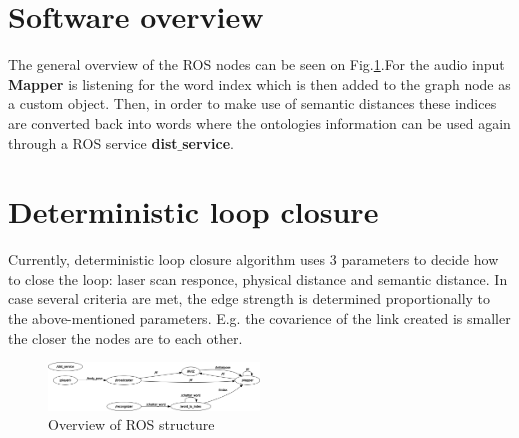\documentclass[conference]{IEEEtran}
\begin{document}
\section{Software overview}

The general overview of the ROS nodes can be seen on Fig.\ref{ROS}.For the audio input \textbf{Mapper} is listening for the word index which is then added to the graph node as a custom object. Then, in order to make use of semantic distances these indices are converted back into words where the ontologies information can be used again through a ROS service \textbf{dist$\_$service}.

\section{Deterministic loop closure}

Currently, deterministic loop closure algorithm uses 3 parameters to decide how to close the loop: laser scan responce, physical distance and semantic distance. In case several criteria are met, the edge strength is determined proportionally to the above-mentioned parameters. E.g. the covarience of the link created is smaller the closer the nodes are to each other.

\begin{figure}[htbp]
    \centerline{\includegraphics[width=0.5\textwidth,height=\textheight,keepaspectratio]{Pictures/overview_ROS.png}}
    \caption{Overview of ROS structure}

    \label{ROS}
\end{figure}





\end{document}
